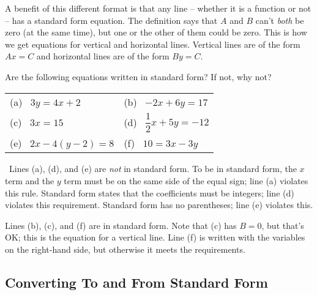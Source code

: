 A benefit of this different format is that any line -- whether it is a function or not -- has a standard form equation. The definition says that $A$ and $B$ can't \textit{both} be zero (at the same time), but one or the other of them could be zero. This is how we get equations for vertical and horizontal lines. Vertical lines are of the form $Ax = C$ and horizontal lines are of the form $By = C$.



\begin{boxedex}
Are the following equations written in standard form? If not, why not?

\begin{center}
\begin{tabularx}{0.8\linewidth}{XX}
(a)~ $3y=4x+2$
&
(b)~ $-2x+6y=17$
\\[3ex]
(c)~ $3x=15$
&
(d)~ $\dfrac{1}{2}x+5y=-12$
\\[3ex]
(e)~ $2x -4(y-2)=8$
&
(f)~ $10 = 3x-3y$
\end{tabularx}
\end{center}

\exsoln\ Lines (a), (d), and (e) are \textit{not} in standard form. To be in standard form, the $x$ term and the $y$ term must be on the same side of the equal sign; line (a) violates this rule. Standard form states that the coefficients must be integers; line (d) violates this requirement. Standard form has no parentheses; line (e) violates this.

Lines (b), (c), and (f) are in standard form. Note that (c) has $B=0$, but that's OK; this is the equation for a vertical line. Line (f) is written with the variables on the right-hand side, but otherwise it meets the requirements.
\end{boxedex}

\subsection{Converting To and From Standard Form}

